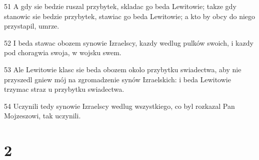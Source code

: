 \par 51 A gdy sie bedzie ruszal przybytek, skladac go beda Lewitowie; takze gdy stanowic sie bedzie przybytek, stawiac go beda Lewitowie; a kto by obcy do niego przystapil, umrze.
\par 52 I beda stawac obozem synowie Izraelscy, kazdy wedlug pulków swoich, i kazdy pod choragwia swoja, w wojsku swem.
\par 53 Ale Lewitowie klasc sie beda obozem okolo przybytku swiadectwa, aby nie przyszedl gniew mój na zgromadzenie synów Izraelskich: i beda Lewitowie trzymac straz u przybytku swiadectwa.
\par 54 Uczynili tedy synowie Izraelscy wedlug wszystkiego, co byl rozkazal Pan Mojzeszowi, tak uczynili.

\chapter{2}

